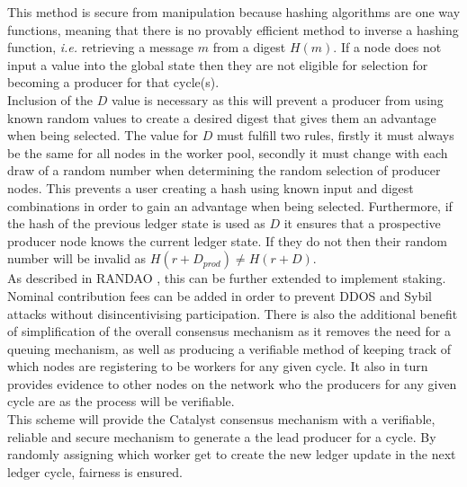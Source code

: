 This method is secure from manipulation because hashing algorithms are one way functions, meaning that there is no provably efficient method to inverse a hashing function, \textit{i.e.} retrieving a message $m$ from a digest $H(m)$. If a node does not input a value into the global state then they are not eligible for selection for becoming a producer for that cycle(s). \\

Inclusion of the $D$ value is necessary as this will prevent a producer from using known random values to create a desired digest that gives them an advantage when being selected. The value for $D$ must fulfill two rules, firstly it must always be the same for all nodes in the worker pool, secondly it must change with each draw of a random number when determining the random selection of producer nodes. This prevents a user creating a hash using known input and digest combinations in order to gain an advantage when being selected. Furthermore, if the hash of the previous ledger state is used as $D$ it ensures that a prospective producer node knows the current ledger state. If they do not then their random number will be invalid as $H(r + D_{prod}) \neq H(r + D)$. \\

As described in RANDAO \cite{randao}, this can be further extended to implement staking. Nominal contribution fees can be added in order to prevent DDOS and Sybil attacks without disincentivising participation. There is also the additional benefit of simplification of the overall consensus mechanism as it removes the need for a queuing mechanism, as well as producing a verifiable method of keeping track of which nodes are registering to be workers for any given cycle. It also in turn provides evidence to other nodes on the network who the producers for any given cycle are as the process will be verifiable. \\

This scheme will provide the Catalyst consensus mechanism with a verifiable, reliable and secure mechanism to generate a the lead producer for a cycle. By randomly assigning which worker get to create the new ledger update in the next ledger cycle, fairness is ensured. \\
